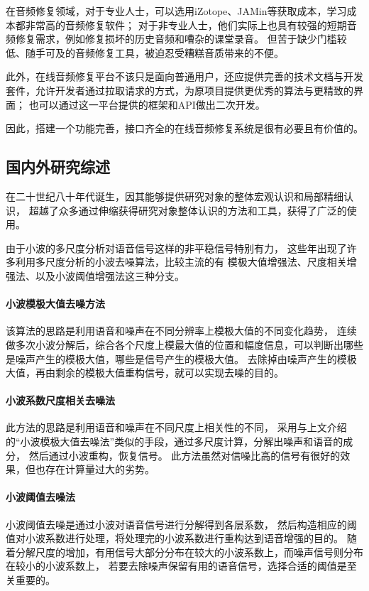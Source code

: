 \documentclass{morningstar}
\begin{document}
在音频修复领域，对于专业人士，可以选用iZotope、JAMin等获取成本，学习成本都非常高的音频修复软件；
对于非专业人士，他们实际上也具有较强的短期音频修复需求，例如修复损坏的历史音频和嘈杂的课堂录音。
但苦于缺少门槛较低、随手可及的音频修复工具，被迫忍受糟糕音质带来的不便。

此外，在线音频修复平台不该只是面向普通用户，还应提供完善的技术文档与开发套件，允许开发者通过拉取请求的方式，为原项目提供更优秀的算法与更精致的界面；
也可以通过这一平台提供的框架和API做出二次开发。

因此，搭建一个功能完善，接口齐全的在线音频修复系统是很有必要且有价值的。


\subsection{国内外研究综述}



在二十世纪八十年代诞生，因其能够提供研究对象的整体宏观认识和局部精细认识，
超越了众多通过伸缩获得研究对象整体认识的方法和工具，获得了广泛的使用。

由于小波的多尺度分析对语音信号这样的非平稳信号特别有力，
这些年出现了许多利用多尺度分析的小波去噪算法，比较主流的有
模极大值增强法、尺度相关增强法、以及小波阈值增强法这三种分支。\cite{wavelet11}

\paragraph{小波模极大值去噪方法}
该算法的思路是利用语音和噪声在不同分辨率上模极大值的不同变化趋势，
连续做多次小波分解后，综合各个尺度上模最大值的位置和幅度信息，可以判断出哪些是噪声产生的模极大值，哪些是信号产生的模极大值。
去除掉由噪声产生的模极大值，再由剩余的模极大值重构信号，就可以实现去噪的目的。

\paragraph{小波系数尺度相关去噪法}
此方法的思路是利用语音和噪声在不同尺度上相关性的不同，
采用与上文介绍的“小波模极大值去噪法”类似的手段，通过多尺度计算，分解出噪声和语音的成分，
然后通过小波重构，恢复信号。
此方法虽然对信噪比高的信号有很好的效果，但也存在计算量过大的劣势。\cite{wavelet9}


\paragraph{小波阈值去噪法}
小波阈值去噪是通过小波对语音信号进行分解得到各层系数，
然后构造相应的阈值对小波系数进行处理，将处理完的小波系数进行重构达到语音增强的目的。 
随着分解尺度的增加，有用信号大部分分布在较大的小波系数上，而噪声信号则分布在较小的小波系数上，
若要去除噪声保留有用的语音信号，选择合适的阈值是至关重要的。\cite{wavelet12}
\end{document}
